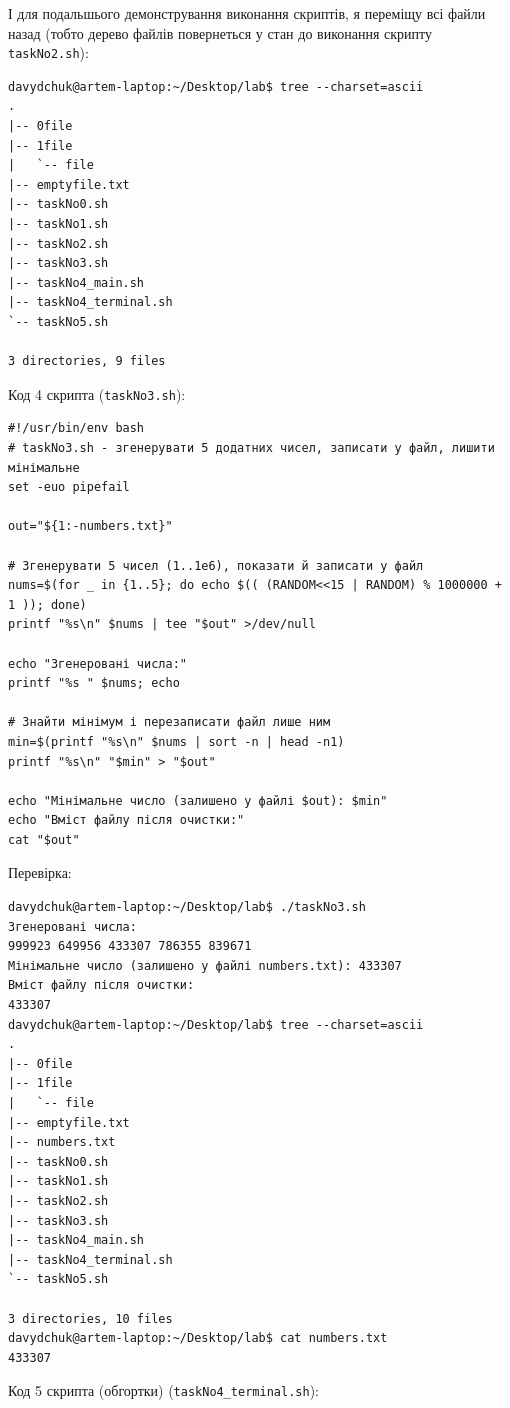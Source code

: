 \documentclass[12pt,a4paper]{article}
\begin{document}
    І для подальшього демонстрування виконання скриптів, я переміщу всі файли назад (тобто дерево файлів повернеться у стан до виконання скрипту \texttt{taskNo2.sh}):

    \begin{verbatim}
davydchuk@artem-laptop:~/Desktop/lab$ tree --charset=ascii
.
|-- 0file
|-- 1file
|   `-- file
|-- emptyfile.txt
|-- taskNo0.sh
|-- taskNo1.sh
|-- taskNo2.sh
|-- taskNo3.sh
|-- taskNo4_main.sh
|-- taskNo4_terminal.sh
`-- taskNo5.sh

3 directories, 9 files
    \end{verbatim}

    Код 4 скрипта (\texttt{taskNo3.sh}):

    \begin{verbatim}
#!/usr/bin/env bash
# taskNo3.sh - згенерувати 5 додатних чисел, записати у файл, лишити мінімальне
set -euo pipefail

out="${1:-numbers.txt}"

# Згенерувати 5 чисел (1..1e6), показати й записати у файл
nums=$(for _ in {1..5}; do echo $(( (RANDOM<<15 | RANDOM) % 1000000 + 1 )); done)
printf "%s\n" $nums | tee "$out" >/dev/null

echo "Згенеровані числа:"
printf "%s " $nums; echo

# Знайти мінімум і перезаписати файл лише ним
min=$(printf "%s\n" $nums | sort -n | head -n1)
printf "%s\n" "$min" > "$out"

echo "Мінімальне число (залишено у файлі $out): $min"
echo "Вміст файлу після очистки:"
cat "$out"
    \end{verbatim}

    Перевірка:
    \begin{verbatim}
davydchuk@artem-laptop:~/Desktop/lab$ ./taskNo3.sh
Згенеровані числа:
999923 649956 433307 786355 839671 
Мінімальне число (залишено у файлі numbers.txt): 433307
Вміст файлу після очистки:
433307
davydchuk@artem-laptop:~/Desktop/lab$ tree --charset=ascii
.
|-- 0file
|-- 1file
|   `-- file
|-- emptyfile.txt
|-- numbers.txt
|-- taskNo0.sh
|-- taskNo1.sh
|-- taskNo2.sh
|-- taskNo3.sh
|-- taskNo4_main.sh
|-- taskNo4_terminal.sh
`-- taskNo5.sh

3 directories, 10 files
davydchuk@artem-laptop:~/Desktop/lab$ cat numbers.txt
433307
    \end{verbatim}

    Код 5 скрипта (обгортки) (\texttt{taskNo4\_terminal.sh}):
\end{document}
